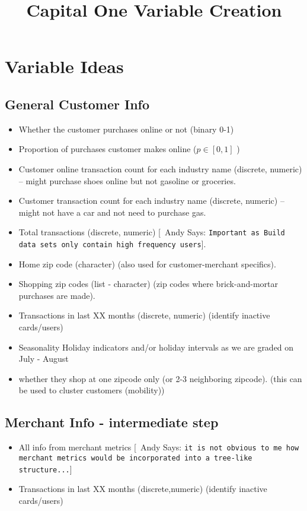 \documentclass{article}
\begin{document}
  \title{\bf Capital One Variable Creation}

 \maketitle
\newcommand{\ac}[1]{[{\color{red}\ Andy Says: {\tt #1}}]}

\section{Variable Ideas}

\subsection{General Customer Info}
\begin{itemize}
\item Whether the customer purchases online or not (binary 0-1)
\item Proportion of purchases customer makes online ($p \in [0,1]$ )
\item Customer online transaction count for each industry name (discrete, numeric) -- might purchase shoes online but not gasoline or groceries.
\item Customer transaction count for each industry name (discrete, numeric) -- might not have a car and not need to purchase gas.
\item Total transactions  (discrete, numeric)  \ac{Important as Build data sets only contain high frequency users}.
\item Home zip code (character) (also used for customer-merchant specifics).
\item Shopping zip codes (list - character) (zip codes where brick-and-mortar purchases are made).
\item Transactions in last XX months (discrete, numeric) (identify inactive cards/users)
\item Seasonality Holiday indicators and/or holiday intervals as we are graded on July - August
\item whether they shop at one zipcode only (or 2-3 neighboring zipcode). (this can be used to cluster customers (mobility))
\end{itemize}

\subsection{Merchant Info - intermediate step}
\begin{itemize}
\item All info from merchant metrics \ac{it is not obvious to me how merchant metrics would be incorporated into a tree-like structure...}
\item Transactions in last XX months (discrete,numeric) (identify inactive cards/users)
\end{itemize}
\end{document}

